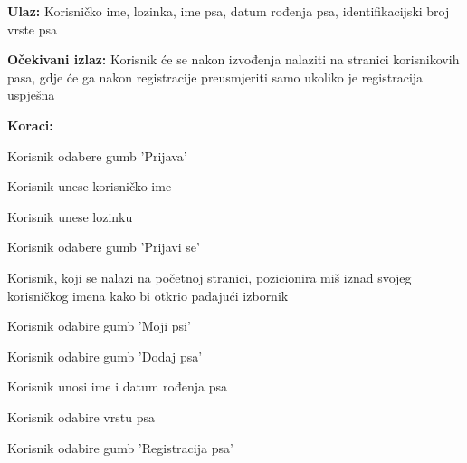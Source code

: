 	 		\begin{packed_item}
	 			
	 			\item \textbf{Ulaz: } Korisničko ime, lozinka, ime psa, datum rođenja psa, identifikacijski broj vrste psa
	 			\item  \textbf{Očekivani izlaz:} Korisnik će se nakon izvođenja nalaziti na stranici korisnikovih pasa, gdje će ga nakon registracije preusmjeriti samo ukoliko je registracija uspješna
	 			\item  \textbf{Koraci:}
	 			
	 			\item[] \begin{packed_enum}
	 				
	 				\item Korisnik odabere gumb 'Prijava'
	 				\item Korisnik unese korisničko ime
	 				\item Korisnik unese lozinku
	 				\item Korisnik odabere gumb 'Prijavi se'
	 				\item Korisnik, koji se nalazi na početnoj stranici, pozicionira miš iznad svojeg korisničkog imena kako bi otkrio padajući izbornik
	 				\item Korisnik odabire gumb 'Moji psi'
	 				\item Korisnik odabire gumb 'Dodaj psa'
	 				\item Korisnik unosi ime i datum rođenja psa
	 				\item Korisnik odabire vrstu psa
	 				\item Korisnik odabire gumb 'Registracija psa'
	 				
	 			\end{packed_enum}
	 		\end{packed_item}
	 		
